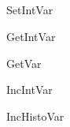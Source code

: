 \subsection{}

\begin{procdesc}{SetIntVar}{}
\end{procdesc}

\begin{procdesc}{GetIntVar}{}
\end{procdesc}

\begin{procdesc}{GetVar}{}
\end{procdesc}

\begin{procdesc}{IncIntVar}{}
\end{procdesc}

\begin{procdesc}{IncHistoVar}{}
\end{procdesc}
